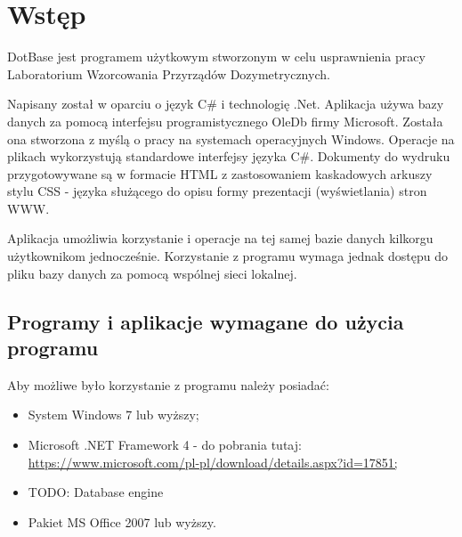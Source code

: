 
\rozdzial


\section{Wstęp}

DotBase jest programem użytkowym stworzonym w celu usprawnienia pracy Laboratorium Wzorcowania Przyrządów Dozymetrycznych.

Napisany został w oparciu o język C\# i technologię .Net. Aplikacja używa bazy danych za pomocą interfejsu programistycznego OleDb firmy Microsoft. Została ona stworzona z myślą o pracy na systemach operacyjnych Windows. Operacje na plikach wykorzystują standardowe interfejsy języka C\#. Dokumenty do wydruku przygotowywane są w formacie HTML z zastosowaniem kaskadowych arkuszy stylu CSS - języka służącego do opisu formy prezentacji (wyświetlania) stron WWW.

Aplikacja umożliwia korzystanie i operacje na tej samej bazie danych kilkorgu użytkownikom jednocześnie. Korzystanie z programu wymaga jednak dostępu do pliku bazy danych za pomocą wspólnej sieci lokalnej.

\subsection{Programy i aplikacje wymagane do użycia programu}

Aby możliwe było korzystanie z programu należy posiadać:
\begin{itemize}
	\item System Windows 7 lub wyższy;
	\item Microsoft .NET Framework 4 - do pobrania tutaj: \url{https://www.microsoft.com/pl-pl/download/details.aspx?id=17851;}
	\item TODO: Database engine
	\item Pakiet MS Office 2007 lub wyższy.
\end{itemize}

